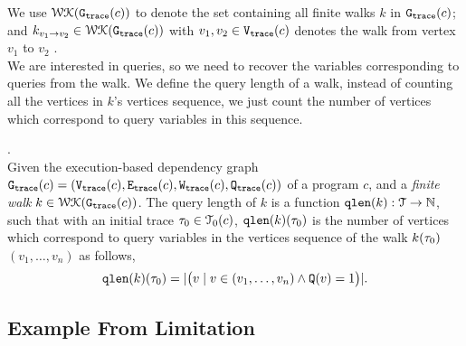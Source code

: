 We use $\mathcal{WK}(\mathtt{{G_{trace}}}(c))$ to denote 
the set containing all finite walks $k$ in $\mathtt{{G_{trace}}}(c)$;
and $k_{v_1 \to v_2} \in \mathcal{WK}(\mathtt{{G_{trace}}}(c))$ with $v_1, v_2 \in \mathtt{{V_{trace}}}(c)$ denotes the walk from vertex $v_1$ to $v_2$ . 
\\
We are interested in queries, so we need to recover the 
variables corresponding to queries from the walk. We define the query length of a walk, 
instead of counting all 
the vertices in $k$'s vertices sequence, we just count the number of vertices which correspond to query variables in this sequence.
%
\begin{defn}.
\label{def:qlen}
\\
Given 
the execution-based dependency graph $\mathtt{{G_{trace}}}({c}) = (\mathtt{{V_{trace}}}({c}), \mathtt{{E_{trace}}}({c}), \mathtt{{W_{trace}}}({c}), \mathtt{{Q_{trace}}}({c}))$ of a program $c$,
 and a \emph{finite walk} 
 $k \in \mathcal{WK}(\mathtt{{G_{trace}}}(c))$. 
The query length of $k$ is a function $\mathtt{qlen}(k): \mathcal{T} \to \mathbb{N}$, such that with an initial trace  $\mathtt{\tau}_0 \in \mathcal{T}_0(c)$, $\mathtt{qlen}(k)(\mathtt{\tau}_0)$ is
the number of vertices which correspond to query variables in the vertices sequence of the walk $k(\mathtt{\tau}_0)$
$(v_1, \ldots, v_{n})$ as follows, 
\[
  \mathtt{qlen}(k)(\mathtt{\tau}_0) = |\big( v \mid v \in (v_1, \ldots, v_{n}) \land \mathtt{Q}(v) = 1 \big)|.
\]
\end{defn}
%
\subsection{Example From Limitation}

